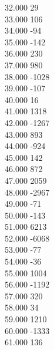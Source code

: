 { 32.000	29 \\
 33.000	106 \\
 34.000	-94 \\
 35.000	-142 \\
 36.000	230 \\
 37.000	980 \\
 38.000	-1028 \\
 39.000	-107 \\
 40.000	16 \\
 41.000	1318 \\
 42.000	-1267 \\
 43.000	893 \\
 44.000	-924 \\
 45.000	142 \\
 46.000	872 \\
 47.000	2059 \\
 48.000	-2967 \\
 49.000	-71 \\
 50.000	-143 \\
 51.000	6213 \\
 52.000	-6068 \\
 53.000	-77 \\
 54.000	-36 \\
 55.000	1004 \\
 56.000	-1192 \\
 57.000	320 \\
 58.000	34 \\
 59.000	1210 \\
 60.000	-1333 \\
 61.000	136 \\
}
